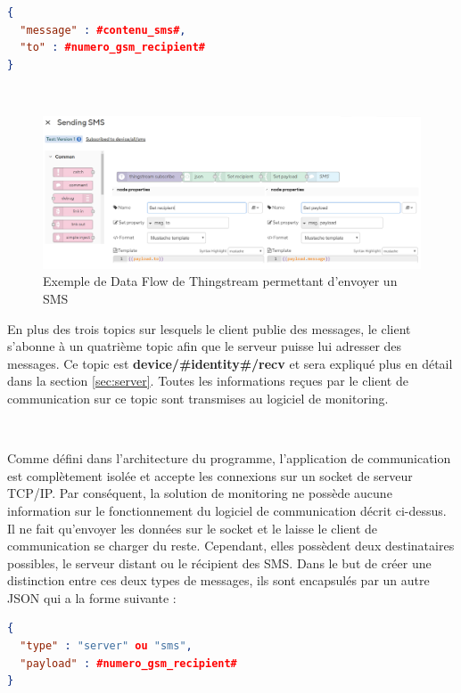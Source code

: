 \begin{lstlisting}[language=json]
{
  "message" : #contenu_sms#,
  "to" : #numero_gsm_recipient#
}
\end{lstlisting}

~

\begin{figure}[ht!]
  \includegraphics[width=\textwidth]{img/app/data_flow.png}
  \caption{Exemple de Data Flow de Thingstream permettant d'envoyer un SMS}
  \label{fig:flow}
\end{figure}


\noindent
En plus des trois topics sur lesquels le client publie des messages, le client s'abonne à un quatrième topic afin que le serveur puisse lui adresser des messages. Ce topic est \textbf{device/\#identity\#/recv} et sera expliqué plus en détail dans la section \ref{sec:server}. Toutes les informations reçues par le client de communication sur ce topic sont transmises au logiciel de monitoring.

~

\noindent
Comme défini dans l'architecture du programme, l'application de communication est complètement isolée et accepte les connexions sur un socket de serveur TCP/IP. Par conséquent, la solution de monitoring ne possède aucune information sur le fonctionnement du logiciel de communication décrit ci-dessus. Il ne fait qu'envoyer les données sur le socket et le laisse le client de communication se charger du reste. Cependant, elles possèdent deux destinataires possibles, le serveur distant ou le récipient des SMS. Dans le but de créer une distinction entre ces deux types de messages, ils sont encapsulés par un autre JSON qui a la forme suivante :

\begin{lstlisting}[language=json]
{
  "type" : "server" ou "sms",
  "payload" : #numero_gsm_recipient#
}
\end{lstlisting}

~

